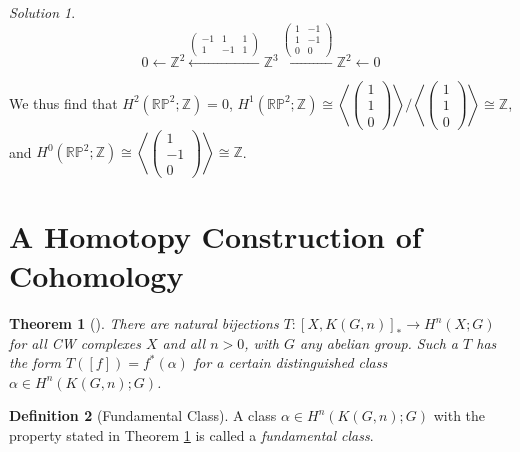 \documentclass[reqno]{amsart}
\newtheorem{theorem}{Theorem}[section]
\theoremstyle{definition}
\newtheorem{definition}[theorem]{Definition}
\theoremstyle{remark}
\newtheorem*{solution}{Solution}
\begin{document}
\begin{solution}
 \[
 0 \leftarrow \mathbb{Z}^2 
 \stackrel{
 \begin{pmatrix} 
     -1 & 1 & 1\\
     1 & -1  & 1
\end{pmatrix} }{\leftarrow}  \mathbb{Z}^3 
\stackrel{
\begin{pmatrix} 
    1 & -1\\
    1 & -1 \\
    0 & 0
\end{pmatrix} }{\leftarrow} \mathbb{Z}^2 \leftarrow  0
 \] 

 We thus find that
 $H^{2}(\mathbb{R}\mathbb{P}^2 ; \mathbb{Z}) = 0$,
 $H^{1}\left( \mathbb{R}\mathbb{P}^2;\mathbb{Z} \right) \cong
 \left<
 \begin{pmatrix} 1 \\ 1 \\ 0 \end{pmatrix} \right>
 / \left< 
 \begin{pmatrix} 1 \\ 1 \\ 0 \end{pmatrix} \right>
 \cong \mathbb{Z}$, and
 $H^{0}\left( \mathbb{R}\mathbb{P}^2; \mathbb{Z} \right) 
 \cong 
 \left< 
 \begin{pmatrix} 1 \\ -1 \\ 0 \end{pmatrix} \right>
 \cong \mathbb{Z}$.
 \end{solution}

\section{A Homotopy Construction of Cohomology}

     \begin{theorem}[]\label{Thm:SIOAJN}
         There are natural bijections
         $T \colon \left[ X, K(G,n) \right]_* \to 
         H^{n}(X;G)$ for all CW complexes $X$ and all
         $n > 0$, with $G$ any abelian group.
         Such a $T$ has the form 
         $T \left( \left[ f \right]  \right) 
         = f^{*}\left( \alpha \right) $ for a certain
         distinguished class
         $\alpha \in H^{n}\left( 
         K(G,n);G\right) $.
     \end{theorem}

     \begin{definition}[Fundamental Class]
          A class $\alpha \in H^{n}\left( 
          K(G,n);G\right) $ with the property
          stated in Theorem \ref{Thm:SIOAJN}
          is called a \textit{fundamental class}.
     \end{definition}
\end{document}
